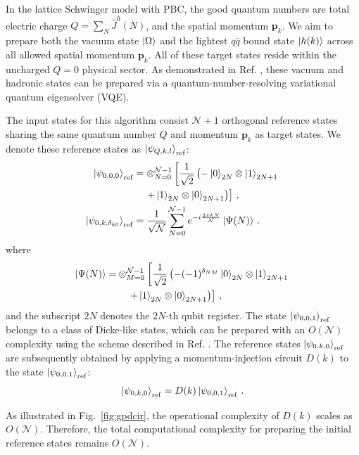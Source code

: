 \documentclass[aps,prd,twocolumn,superscriptaddress,notitlepage,nofootinbib,preprintnumbers]{revtex4-1}
\begin{document}
In the lattice Schwinger model with PBC, the good quantum numbers are total electric charge $Q=\sum_{N} \hat{J}^0(N)$, and the spatial momentum $\mathbf{p}_k$. We aim to prepare both the vacuum state $\ket{\Omega}$ and the lightest $q\bar{q}$ bound state $\ket{h(k)}$ across all allowed spatial momentum $\mathbf{p}_k$. All of these target states reside within the uncharged $Q = 0$ physical sector. As demonstrated in Ref. \cite{Li:2021kcs}, these vacuum and hadronic states can be prepared via a quantum-number-resolving variational quantum eigensolver (VQE).


The input states for this algorithm consist  $\mathcal{N}+1$ orthogonal reference states sharing the same quantum number $Q$ and momentum $\mathbf{p}_k$ as target states. We denote these reference states as $\ket{\psi_{Q,k,l}}_{\rm ref}$:
\begin{align}\label{eq:refst}
    \ket{\psi_{0,0,0}}_{\rm ref} &= \otimes_{N=0}^{\mathcal{N}-1}\left[\frac{1}{\sqrt{2}}\left(-\ket{0}_{2N}\otimes \ket{1}_{2N+1}\right.\right.\nonumber\\
    &\left.\left.\quad+\ket{1}_{2N}\otimes \ket{0}_{2N+1}\right)\right]\,, \nonumber\\
    \ket{\psi_{0,k,\delta_{k0}}}_{\rm ref} &= \frac{1}{\sqrt{\mathcal{N}}} \sum_{N=0}^{\mathcal{N}-1} e^{-i \frac{2\pi k N}{\mathcal{N}}}  \ket{\Psi(N)}\,.
\end{align}
where
\begin{align}
    \ket{\Psi(N)} =& \otimes_{M=0}^{\mathcal{N}-1}\left[\frac{1}{\sqrt{2}}\left(-(-1)^{\delta_{NM}}\ket{0}_{2N}\otimes \ket{1}_{2N+1}\right.\right.\nonumber\\
    &\left.\left.\quad+\ket{1}_{2N}\otimes \ket{0}_{2N+1}\right)\right]\,,
\end{align}
and the subscript $2N$ denotes the $2N$-th qubit register. 
The state $\ket{\psi_{0,0,1}}_{\rm ref}$ belongs to a class of Dicke-like states, which can be prepared with an $O(\mathcal{N})$ complexity using the scheme described in Ref. \cite{Li:2022lyt}. 
The reference states $\ket{\psi_{0,k,0}}_{\rm ref}$ are subsequently obtained by applying a momentum-injection circuit $D(k)$ to the state $\ket{\psi_{0,0,1}}_{\rm ref}$:
\begin{align}
    \ket{\psi_{0,k,0}}_{\rm ref} = D(k) \ket{\psi_{0,0,1}}_{\rm ref}\,.
\end{align}



As illustrated in Fig.~\ref{fig:gpdcir}, the operational complexity of $D(k)$ scales as $O(\mathcal{N})$. Therefore, the total computational complexity for preparing the initial reference states remains $O(\mathcal{N})$.
\end{document}
